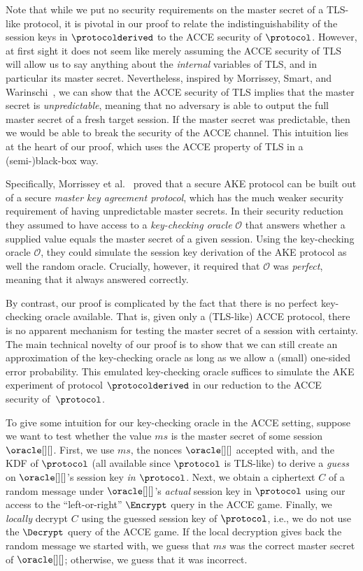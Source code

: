 Note that while we put no security requirements on the master secret of a TLS-like protocol,
it is pivotal in our proof to relate the indistinguishability of the session keys in $\protocolderived$ to the ACCE security of $\protocol$.
However,
at first sight it does not seem like merely assuming the ACCE security of TLS will allow us to say anything about the \emph{internal} variables of TLS,
and in particular its master secret. 
Nevertheless, 
inspired by Morrissey, Smart, and Warinschi~\cite{JC:MorSmaWar10},
we can show that the ACCE security of TLS implies that the master secret is \emph{unpredictable},
meaning that no adversary is able to output the full master secret of a fresh target session.
If the master secret was predictable, then we would be able to break the security of the ACCE channel. 
This intuition lies at the heart of our proof,
which uses the ACCE property of TLS in a (semi-)black-box way.


Specifically,
Morrissey et al.~\cite{JC:MorSmaWar10} proved that a secure AKE protocol can be built out of a secure \emph{master key agreement protocol},
which has the much weaker security requirement of having unpredictable master secrets.  
In their security reduction
they assumed to have access to a \emph{key-checking oracle} $\mathcal{O}$ that answers whether a supplied value equals the master secret of a given session.
Using the key-checking oracle $\mathcal{O}$,
they could simulate the session key derivation of the AKE protocol as well the random oracle.
Crucially,
however,
it required that  $\mathcal{O}$ was \emph{perfect},
meaning that it always answered correctly.



By contrast,
our proof is complicated by the fact that there is no perfect key-checking oracle available.
That is,
given only a (TLS-like) ACCE protocol,
there is no apparent mechanism for testing the master secret of a session with certainty.
The main technical novelty of our proof is to show that we can still create an approximation of the key-checking oracle as long as we allow a (small) one-sided error probability.
This emulated key-checking oracle suffices to simulate the AKE experiment of protocol $\protocolderived$ in our reduction to the ACCE security of~$\protocol$.

To give some intuition for our key-checking oracle in the ACCE setting,
suppose we want to test whether the value  $ms$ is the master secret of some session $\oracle[][]$.
First, 
we use $ms$,
the nonces $\oracle[][]$ accepted with,
and the KDF of $\protocol$
(all available since $\protocol$ is TLS-like)
to derive a \emph{guess} on $\oracle[][]$'s session key \emph{in $\protocol$}.
Next, we obtain a ciphertext $C$ of a random message under $\oracle[][]$'s \emph{actual} session key in $\protocol$
using our access to the ``left-or-right'' $\Encrypt$ query in the ACCE game. 
Finally,
we \emph{locally} decrypt $C$ using the guessed session key of $\protocol$, 
i.e., we do not use the $\Decrypt$ query of the ACCE game.
If the local decryption gives back the random message we started with, 
we guess that $ms$ was the correct master secret of $\oracle[][]$;
otherwise, we guess that it was incorrect.

